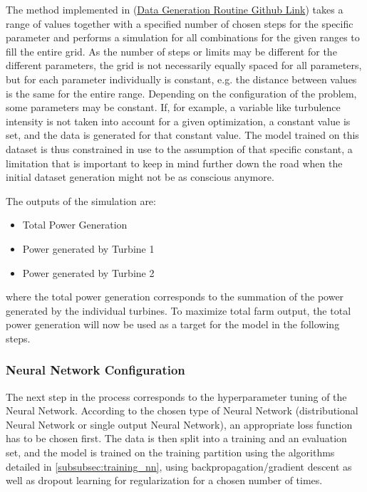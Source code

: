 The method implemented in (\href{https://github.com/schmeti/uc3m_TFM_wind_farm_optimization_codebase/blob/main/Windfarm_power_modelling/src/simulate_data.py}{Data Generation Routine Github Link}) takes a range of values together with a specified number of chosen steps for the specific parameter and performs a simulation for all combinations for the given ranges to fill the entire grid. As the number of steps or limits may be different for the different parameters, the grid is not necessarily equally spaced for all parameters, but for each parameter individually is constant, e.g. the distance between values is the same for the entire range.  
Depending on the configuration of the problem, some parameters may be constant. If, for example, a variable like turbulence intensity is not taken into account for a given optimization, a constant value is set, and the data is generated for that constant value. The model trained on this dataset is thus constrained in use to the assumption of that specific constant, a limitation that is important to keep in mind further down the road when the initial dataset generation might not be as conscious anymore. 

The outputs of the simulation are:
\begin{itemize}
	\item Total Power Generation
	\item Power generated by Turbine 1
	\item Power generated by Turbine 2
\end{itemize}

where the total power generation corresponds to the summation of the power generated by the individual turbines. To maximize total farm output, the total power generation will now be used as a target for the model in the following steps.

\subsubsection{Neural Network Configuration}

The next step in the process corresponds to the hyperparameter tuning of the Neural Network. According to the chosen type of Neural Network (distributional Neural Network or single output Neural Network), an appropriate loss function has to be chosen first. The data is then split into a training and an evaluation set, and the model is trained on the training partition using the algorithms detailed in  \ref{subsubsec:training_nn}, using backpropagation/gradient descent as well as dropout learning for regularization for a chosen number of times.  

